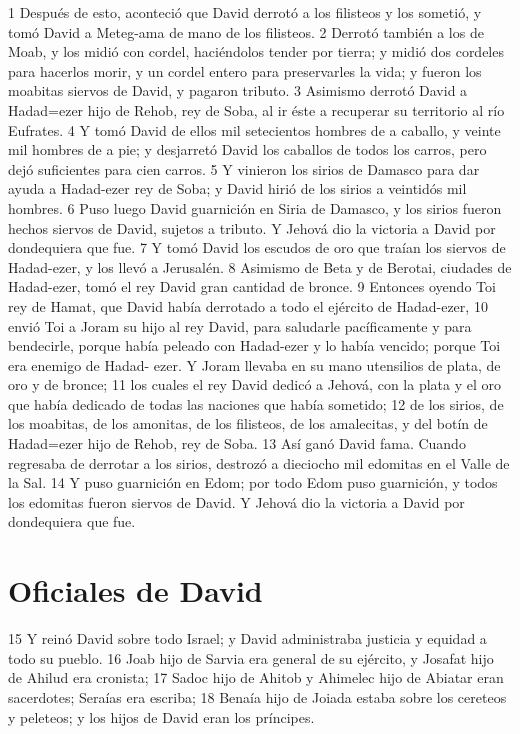  
1 Después de esto, aconteció que David derrotó a los filisteos y los sometió, y tomó David a Meteg-ama de mano de los filisteos.
2 Derrotó también a los de Moab, y los midió con cordel, haciéndolos tender por tierra; y midió dos cordeles para hacerlos morir, y un cordel entero para preservarles la vida; y fueron los moabitas siervos de David, y pagaron tributo.
3 Asimismo derrotó David a Hadad=ezer hijo de Rehob, rey de Soba, al ir éste a recuperar su territorio al río Eufrates.
4 Y tomó David de ellos mil setecientos hombres de a caballo, y veinte mil hombres de a pie; y desjarretó David los caballos de todos los carros, pero dejó suficientes para cien carros.
5 Y vinieron los sirios de Damasco para dar ayuda a Hadad-ezer rey de Soba; y David hirió de los sirios a veintidós mil hombres.
6 Puso luego David guarnición en Siria de Damasco, y los sirios fueron hechos siervos de David, sujetos a tributo. Y Jehová dio la victoria a David por dondequiera que fue.
7 Y tomó David los escudos de oro que traían los siervos de Hadad-ezer, y los llevó a Jerusalén.
8 Asimismo de Beta y de Berotai, ciudades de Hadad-ezer, tomó el rey David gran cantidad de bronce.
9 Entonces oyendo Toi rey de Hamat, que David había derrotado a todo el ejército de Hadad-ezer,
10 envió Toi a Joram su hijo al rey David, para saludarle pacíficamente y para bendecirle, porque había peleado con Hadad-ezer y lo había vencido; porque Toi era enemigo de Hadad- ezer. Y Joram llevaba en su mano utensilios de plata, de oro y de bronce;
11 los cuales el rey David dedicó a Jehová, con la plata y el oro que había dedicado de todas las naciones que había sometido;
12 de los sirios, de los moabitas, de los amonitas, de los filisteos, de los amalecitas, y del botín de Hadad=ezer hijo de Rehob, rey de Soba.
13 Así ganó David fama. Cuando regresaba de derrotar a los sirios, destrozó a dieciocho mil edomitas en el Valle de la Sal. 
14 Y puso guarnición en Edom; por todo Edom puso guarnición, y todos los edomitas fueron siervos de David. Y Jehová dio la victoria a David por dondequiera que fue.
\section*{Oficiales de David}

 
15 Y reinó David sobre todo Israel; y David administraba justicia y equidad a todo su pueblo.
16 Joab hijo de Sarvia era general de su ejército, y Josafat hijo de Ahilud era cronista;
17 Sadoc hijo de Ahitob y Ahimelec hijo de Abiatar eran sacerdotes; Seraías era escriba;
18 Benaía hijo de Joiada estaba sobre los cereteos y peleteos; y los hijos de David eran los príncipes.

